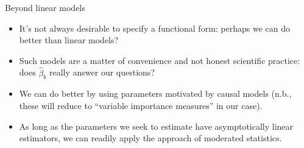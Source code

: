 \documentclass[12pt,t,handout]{beamer}
\begin{document}
\begin{frame}[c]{Beyond linear models}

\begin{center}
\begin{itemize}
  \itemsep12pt
  \item It's not always desirable to specify a functional form: perhaps we can
    do better than linear models?
  \item Such models are a matter of convenience and not honest scientific
    practice: does $\hat{\beta}_{b}$ really answer our questions?
  \item We can do better by using parameters motivated by causal models (n.b.,
    these will reduce to ``variable importance measures'' in our case).
  \item As long as the parameters we seek to estimate have asymptotically linear
    estimators, we can readily apply the approach of moderated statistics.
\end{itemize}
\end{center}

\end{frame}
\end{document}
